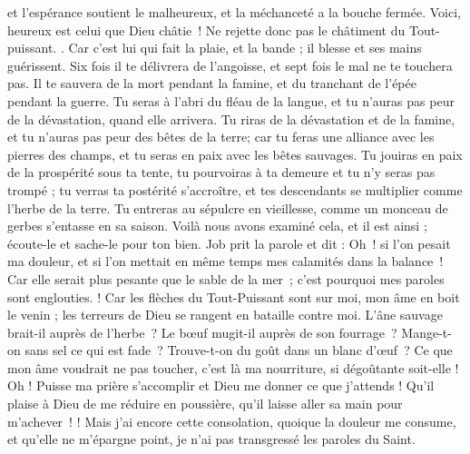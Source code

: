 \begin{multicols}{2}
et l'espérance soutient le malheureux, et la méchanceté a la bouche fermée.
Voici, heureux est celui que Dieu châtie ! Ne rejette donc pas le châtiment du Tout-puissant.
.
Car c'est lui qui fait la plaie, et la bande ; il blesse et ses mains guérissent.
Six fois il te délivrera de l'angoisse, et sept fois le mal ne te touchera pas.
Il te sauvera de la mort pendant la famine, et du tranchant de l'épée pendant la guerre.
Tu seras à l'abri du fléau de la langue, et tu n’auras pas peur de la dévastation, quand elle arrivera.
Tu riras de la dévastation et de la famine, et tu n'auras pas peur des bêtes de la terre;
car tu feras une alliance avec les pierres des champs, et tu seras en paix avec les bêtes sauvages.
Tu jouiras en paix de la prospérité sous ta tente, tu pourvoiras à ta demeure et tu n'y seras pas trompé ;
tu verras ta postérité s'accroître, et tes descendants se multiplier comme l'herbe de la terre.
Tu entreras au sépulcre en vieillesse, comme un monceau de gerbes s'entasse en sa saison.
Voilà nous avons examiné cela, et il est ainsi ; écoute-le et sache-le pour ton bien.
\VerseOne{}Job prit la parole et dit :
Oh ! si l’on pesait ma douleur, et si l’on mettait en même temps mes calamités dans la balance !
Car elle serait plus pesante que le sable de la mer ; c’est pourquoi mes paroles sont englouties.
 !
Car les flèches du Tout-Puissant sont sur moi, mon âme en boit le venin ; les terreurs de Dieu se rangent en bataille contre moi.
L'âne sauvage brait-il auprès de l’herbe ? Le bœuf mugit-il auprès de son fourrage ?
Mange-t-on sans sel ce qui est fade ? Trouve-t-on du goût dans un blanc d’œuf ?
Ce que mon âme voudrait ne pas toucher, c'est là ma nourriture, si dégoûtante soit-elle !
Oh ! Puisse ma prière s'accomplir et Dieu me donner ce que j'attends !
Qu’il plaise à Dieu de me réduire en poussière, qu’il laisse aller sa main pour m’achever !
!
Mais j’ai encore cette consolation, quoique la douleur me consume, et qu’elle ne m’épargne point, je n'ai pas transgressé les paroles du Saint.

\end{multicols}
